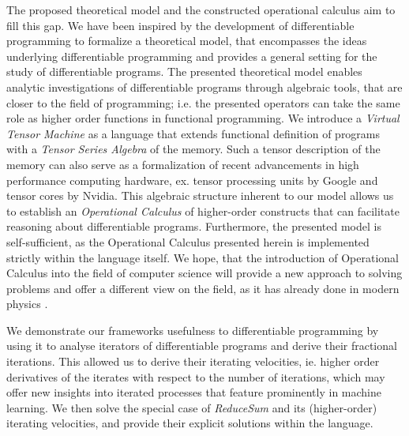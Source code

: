 The proposed theoretical model and the constructed operational calculus aim to
fill this gap. We have been inspired by the development of differentiable programming to
formalize a theoretical model, that encompasses the ideas underlying
differentiable programming and provides a general setting for the study of
differentiable programs. The presented theoretical model enables analytic
investigations of differentiable programs through algebraic tools, that are
closer to the field of programming; i.e. the presented operators can take the
same role as higher order functions in functional programming. We introduce a
\emph{Virtual Tensor Machine} as a language that extends functional definition
of programs with a \emph{Tensor Series Algebra} of the memory. Such a tensor
description of the memory can also serve as a formalization of recent
advancements in high performance computing hardware, ex. tensor processing
units by Google and tensor cores by Nvidia. This algebraic structure inherent
to our model allows us to establish an \emph{Operational Calculus} of
higher-order constructs that can facilitate reasoning about differentiable
programs. Furthermore, the presented model is self-sufficient, as the
Operational Calculus presented herein is implemented strictly within the
language itself. We hope, that the introduction of Operational Calculus into the
field of computer science will provide a new approach to solving problems and offer
a different view on the field, as it has already done in modern physics \cite{OpCalc}.

We demonstrate our frameworks usefulness to differentiable programming by using it to
analyse iterators of differentiable programs and derive their fractional iterations.
This allowed us to derive their iterating velocities, ie. higher order derivatives of
the iterates with respect to the number of iterations, which may offer new insights
into iterated processes that feature prominently in machine learning. We then solve the
special case of \emph{ReduceSum} and its (higher-order) iterating velocities, and
provide their explicit solutions within the language.

